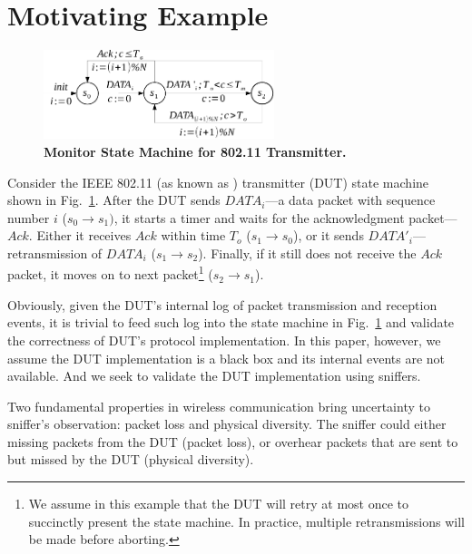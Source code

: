 \section{Motivating Example}
\label{sec:motivation}

\begin{figure}[h!]
  \vspace*{\beforecaptionskip}
  \centering
  \includegraphics[width=0.6\textwidth]{./figures/dot11_tx_ta.pdf}
  \caption{\textbf{Monitor State Machine for 802.11 Transmitter.}}
  \label{fig:dot11_tx_ta}
  \vspace*{\aftercaptionskip}
\end{figure}

Consider the IEEE 802.11 (as known as \wifi{}) transmitter (DUT) state machine
shown in Fig.~\ref{fig:dot11_tx_ta}. After the DUT sends $DATA_i$---a data
packet with sequence number $i$ ($s_0\rightarrow s_1)$, it starts a timer and
waits for the acknowledgment packet---$Ack$. Either it receives $Ack$ within time
$T_o$ ($s_1\rightarrow s_0$), or it sends $DATA'_i$---retransmission of $DATA_i$
($s_1\rightarrow s_2$). Finally, if it still does not receive the $Ack$ packet,
it moves on to next packet\footnote{We assume in this example that the DUT will
retry at most once to succinctly present the state machine.  In practice,
multiple retransmissions will be made before aborting.} ($s_2\rightarrow s_1$).

Obviously, given the DUT's internal log of packet transmission and reception
events, it is trivial to feed such log into the state machine in
Fig.~\ref{fig:dot11_tx_ta} and validate the correctness of DUT's protocol
implementation. In this paper, however, we assume the DUT implementation is a
black box and its internal events are not available. And we seek to validate the
DUT implementation using sniffers.

Two fundamental properties in wireless communication bring uncertainty
to sniffer's observation: packet loss and physical diversity. The sniffer could
either missing packets from the DUT (packet loss), or overhear packets that are
sent to but missed by the DUT (physical diversity).

